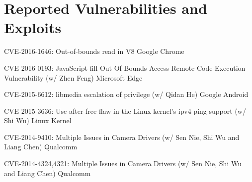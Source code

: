 \section*{Reported Vulnerabilities and Exploits}
\begin{description}
	\item CVE-2016-1646: Out-of-bounds read in V8 \dotfill Google Chrome
	\item CVE-2016-0193: JavaScript fill Out-Of-Bounds Access Remote Code Execution Vulnerability (w/ Zhen Feng) \dotfill Microsoft Edge
	\item CVE-2015-6612: libmedia escalation of privilege (w/ Qidan He) \dotfill Google Android
	\item CVE-2015-3636: Use-after-free flaw in the Linux kernel’s ipv4 ping support (w/ Shi Wu) \dotfill Linux Kernel
	\item CVE-2014-9410: Multiple Issues in Camera Drivers (w/ Sen Nie, Shi Wu and Liang Chen) \dotfill Qualcomm
	\item CVE-2014-4324,4321: Multiple Issues in Camera Drivers (w/ Sen Nie, Shi Wu and Liang Chen) \dotfill Qualcomm
\end{description}

